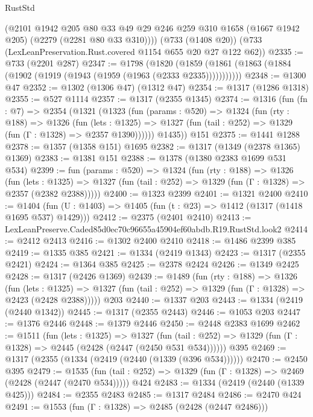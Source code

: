 \begin{lexlean}{RustStd}
\begin{coremodule}
      (@2101
        @1942
        @205
        @80
        @33
        @49
        @29
        @246
        @259
        @310
        @1658
        (@1667 @1942 @205)
        (@2279 (@2281 @80 @33 @310))))
    (@733 (@1408 @20))
    (@733 (LexLeanPreservation.Rust.covered @1154 @655 @20 @27 @122 @62))
@2335 := @733 (@2201 @287)
@2347 := @1798
    (@1820 (@1859 (@1861 (@1863 (@1884 (@1902 (@1919 (@1943 (@1959 (@1963 (@2333 @2335)))))))))))
@2348 := @1300 @47
@2352 := @1302 (@1306 @47) (@1312 @47)
@2354 := @1317 (@1286 @1318)
@2355 := @527 @1114
@2357 := @1317 (@2355 @1345)
@2374 := @1316
    (fun (fn : @7) =>
    @2354
      (@1321
        (@1323
          (fun (params : @520) =>
          @1324
            (fun (rty : @188) =>
            @1326
              (fun (lets : @1325) =>
              @1327 (fun (tail : @252) => @1329 (fun (Γ : @1328) => @2357 @1390))))))
        @1435))
    @151
@2375 := @1441 @1288
@2378 := @1357 (@1358 @151) @1695
@2382 := @1317 (@1349 (@2378 @1365) @1369)
@2383 := @1381 @151
@2388 := @1378 (@1380 @2383 @1699 @531 @534)
@2399 := fun (params : @520) =>
  @1324
    (fun (rty : @188) =>
    @1326
      (fun (lets : @1325) =>
      @1327 (fun (tail : @252) => @1329 (fun (Γ : @1328) => @2357 (@2382 @2388)))))
@2400 := @1323 @2399
@2401 := @1321 @2400
@2410 := @1404 (fun (U : @1403) => @1405 (fun (t : @23) => @1412 (@1317 (@1418 @1695 @537) @1429)))
@2412 := @2375 (@2401 @2410)
@2413 := LexLeanPreserve.Caded85d0ec70c96655a45904ef60abdb.R19.RustStd.look2
@2414 := @2412 @2413
@2416 := @1302 @2400 @2410
@2418 := @1486 @2399 @385
@2419 := @1335 @385
@2421 := @1334 (@2419 @1343)
@2423 := @1317 (@2355 @2421)
@2424 := @1364 @385
@2425 := @2378 @2424
@2426 := @1349 @2425
@2428 := @1317 (@2426 @1369)
@2439 := @1489
    (fun (rty : @188) =>
    @1326
      (fun (lets : @1325) =>
      @1327 (fun (tail : @252) => @1329 (fun (Γ : @1328) => @2423 (@2428 @2388)))))
    @203
@2440 := @1337 @203
@2443 := @1334 (@2419 (@2440 @1342))
@2445 := @1317 (@2355 @2443)
@2446 := @1053 @203
@2447 := @1376 @2446
@2448 := @1379 @2446
@2450 := @2448 @2383 @1699
@2462 := @1511
    (fun (lets : @1325) =>
    @1327 (fun (tail : @252) => @1329 (fun (Γ : @1328) => @2445 (@2428 (@2447 (@2450 @531 @534))))))
    @395
@2469 := @1317 (@2355 (@1334 (@2419 (@2440 (@1339 (@396 @534))))))
@2470 := @2450 @395
@2479 := @1535
    (fun (tail : @252) => @1329 (fun (Γ : @1328) => @2469 (@2428 (@2447 (@2470 @534)))))
    @424
@2483 := @1334 (@2419 (@2440 (@1339 @425)))
@2484 := @2355 @2483
@2485 := @1317 @2484
@2486 := @2470 @424
@2491 := @1553 (fun (Γ : @1328) => @2485 (@2428 (@2447 @2486)))

\end{coremodule}
\end{lexlean}
